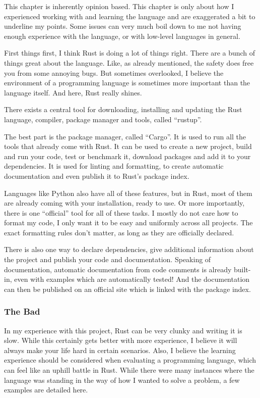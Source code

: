 This chapter is inherently opinion based. This chapter is only about how I
experienced working with and learning the language and are exaggerated a bit
to underline my points. Some issues can very much boil down to me not having
enough experience with the language, or with low-level languages in general.

First things first, I think Rust is doing a lot of things right. There are a
bunch of things great about the language. Like, as already mentioned, the
safety does free you from some annoying bugs. But sometimes overlooked, I
believe the environment of a programming language is sometimes more important
than the language itself. And here, Rust really shines.

There exists a central tool for downloading, installing and updating the Rust
language, compiler, package manager and tools, called ``rustup''.

The best part is the package manager, called ``Cargo''. It is used to run all
the tools that already come with Rust. It can be used to create a new project,
build and run your code, test or benchmark it, download packages and add it to
your dependencies. It is used for linting and formatting, to create automatic
documentation and even publish it to Rust's package index.

Languages like Python also have all of these features, but in Rust, most of
them are already coming with your installation, ready to use. Or more
importantly, there is one ``official'' tool for all of these tasks. I mostly
do not care how to format my code, I only want it to be easy and uniformly
across all projects. The exact formatting rules don't matter, as long as they
are officially declared.

There is also one way to declare dependencies, give additional information
about the project and publish your code and documentation. Speaking of
documentation, automatic documentation from code comments is already built-in,
even with examples which are automatically tested! And the documentation can
then be published on an official site which is linked with the package index.

\subsubsection{The Bad}\label{the-bad}

In my experience with this project, Rust can be very clunky and writing it is
slow. While this certainly gets better with more experience, I believe it will
always make your life hard in certain scenarios. Also, I believe the learning
experience should be considered when evaluating a programming language, which
can feel like an uphill battle in Rust. While there were many instances where
the language was standing in the way of how I wanted to solve a problem, a few
examples are detailed here.


